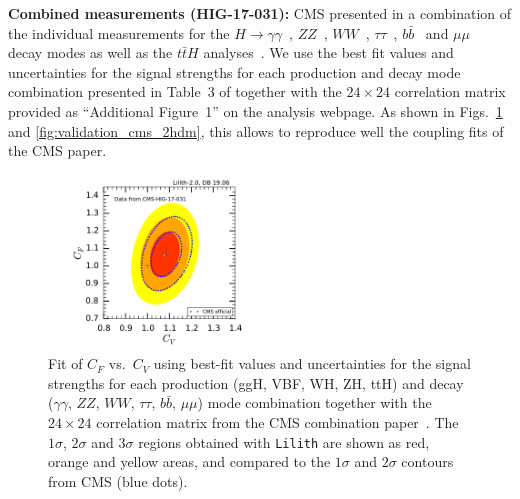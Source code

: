 {\bf\boldmath Combined measurements (HIG-17-031):} 
CMS presented in \cite{Sirunyan:2018koj} a combination of the individual measurements for the 
$H\to \gamma\gamma$~\cite{Sirunyan:2018ouh}, $ZZ$~\cite{Sirunyan:2017exp}, $WW$~\cite{Sirunyan:2018egh}, 
$\tau\tau$~\cite{Sirunyan:2017khh}, $b\bar b$~\cite{Sirunyan:2017elk,Sirunyan:2017dgc} and $\mu\mu$~\cite{Sirunyan:2018hbu} 
decay modes as well as the $t\bar tH$ analyses~\cite{Sirunyan:2018shy,Sirunyan:2018mvw,Sirunyan:2018ygk}. 
We use the best fit values and uncertainties for the signal strengths for each production %
and decay  %
mode combination presented in Table~3 of \cite{Sirunyan:2018koj} together with the $24\times 24$ correlation matrix 
provided as ``Additional Figure~1'' on the analysis webpage. As shown in Figs.~\ref{fig:validation_cms_combination} 
and \ref{fig:validation_cms_2hdm}, 
this allows to reproduce well the coupling fits of the CMS paper.\\

\begin{figure}[hbt!]\centering
\includegraphics[width=0.55\textwidth]{validation/CMS/HIG-17-031-CVCF.pdf}%
\vspace*{-2mm}
\caption{Fit of $C_F$ vs.\ $C_V$ using best-fit values and uncertainties for the signal strengths for each production (ggH, VBF, WH, ZH, ttH) 
and decay ($\gamma\gamma$, $ZZ$, $WW$, $\tau\tau$, $b\bar b$, $\mu\mu$) mode combination together with the 
$24\times 24$ correlation matrix from the CMS combination paper~\cite{Sirunyan:2018koj}. 
The  $1\sigma$,  $2\sigma$ and $3\sigma$ regions obtained with {\tt Lilith} are shown as red, orange and yellow areas, 
and compared to the $1\sigma$ and $2\sigma$ contours from CMS (blue dots).}
\label{fig:validation_cms_combination}
\end{figure}

